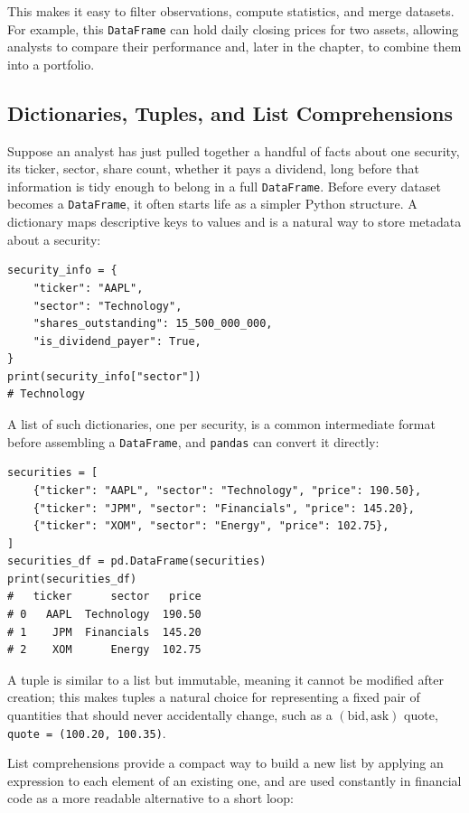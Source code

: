 \documentclass[../ai_in_finance]{subfiles}
\begin{document}
This makes it easy to filter observations, compute statistics, and merge datasets. For example, this \texttt{DataFrame} can hold daily closing prices for two assets, allowing analysts to compare their performance and, later in the chapter, to combine them into a portfolio.

\subsection{Dictionaries, Tuples, and List Comprehensions}

Suppose an analyst has just pulled together a handful of facts about one security, its ticker, sector, share count, whether it pays a dividend, long before that information is tidy enough to belong in a full \texttt{DataFrame}. Before every dataset becomes a \texttt{DataFrame}, it often starts life as a simpler Python structure. A dictionary maps descriptive keys to values and is a natural way to store metadata about a security:

\begin{verbatim}
security_info = {
    "ticker": "AAPL",
    "sector": "Technology",
    "shares_outstanding": 15_500_000_000,
    "is_dividend_payer": True,
}
print(security_info["sector"])
# Technology
\end{verbatim}

A list of such dictionaries, one per security, is a common intermediate format before assembling a \texttt{DataFrame}, and \texttt{pandas} can convert it directly:

\begin{verbatim}
securities = [
    {"ticker": "AAPL", "sector": "Technology", "price": 190.50},
    {"ticker": "JPM", "sector": "Financials", "price": 145.20},
    {"ticker": "XOM", "sector": "Energy", "price": 102.75},
]
securities_df = pd.DataFrame(securities)
print(securities_df)
#   ticker      sector   price
# 0   AAPL  Technology  190.50
# 1    JPM  Financials  145.20
# 2    XOM      Energy  102.75
\end{verbatim}

A tuple is similar to a list but immutable, meaning it cannot be modified after creation; this makes tuples a natural choice for representing a fixed pair of quantities that should never accidentally change, such as a $(\text{bid}, \text{ask})$ quote, \texttt{quote = (100.20, 100.35)}.

List comprehensions provide a compact way to build a new list by applying an expression to each element of an existing one, and are used constantly in financial code as a more readable alternative to a short loop:
\end{document}
